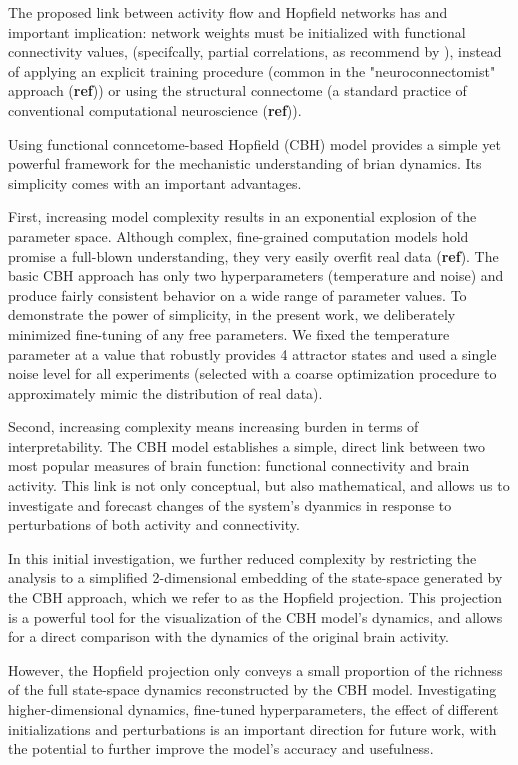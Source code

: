\documentclass{article}
\begin{document}
The proposed link between activity flow and Hopfield networks has and important implication: network weights must be initialized with functional connectivity values, (specifcally, partial correlations, as recommend by \href{https://doi.org/10.1038/nn.4406}{}), instead of applying an explicit training procedure (common in the "neuroconnectomist" approach (\textbf{ref})) or using the structural connectome (a standard practice of conventional computational neuroscience (\textbf{ref})).

Using functional conncetome-based Hopfield (CBH) model provides a simple yet powerful framework for the mechanistic understanding of brian dynamics. Its simplicity comes with an important advantages.

First, increasing model complexity results in an exponential explosion of the parameter space. Although complex, fine-grained computation models hold promise a full-blown understanding, they very easily overfit real data (\textbf{ref}). The basic CBH approach has only two hyperparameters (temperature and noise) and produce fairly consistent behavior on a wide range of parameter values. To demonstrate the power of simplicity, in the present work, we deliberately minimized fine-tuning of any free parameters. We fixed the temperature parameter at a value that robustly provides 4 attractor states and used a single noise level for all experiments (selected with a coarse optimization procedure to approximately mimic the distribution of real data).

Second, increasing complexity means increasing burden in terms of interpretability. The CBH model establishes a simple, direct link between two most popular measures of brain function: functional connectivity and brain activity. This link is not only conceptual, but also mathematical, and allows us to investigate and forecast changes of the system's dyanmics in response to perturbations of both activity and connectivity.

In this initial investigation, we further reduced complexity by restricting the analysis to a simplified 2-dimensional embedding of the state-space generated by the CBH approach, which we refer to as the Hopfield projection. This projection is a powerful tool for the visualization of the CBH model's dynamics, and allows for a direct comparison with the dynamics of the original brain activity.

However, the Hopfield projection only conveys a small proportion of the richness of the full state-space dynamics reconstructed by the CBH model.
Investigating higher-dimensional dynamics, fine-tuned hyperparameters, the effect of different initializations and perturbations is an important direction for future work, with the potential to further improve the model's accuracy and usefulness.
\end{document}
